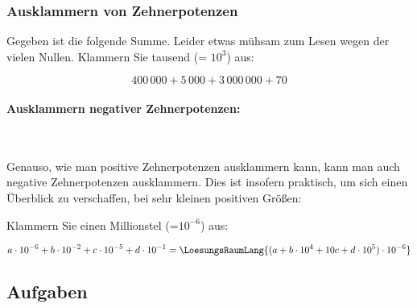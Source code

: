 

\newpage


\subsubsection{Ausklammern von Zehnerpotenzen}
Gegeben ist die folgende Summe. Leider etwas mühsam zum Lesen wegen der vielen Nullen. Klammern Sie tausend (= $10^3$) aus:

$$400\,000 + 5\,000 + 3\,000\,000 + 70$$


\paragraph{Ausklammern negativer Zehnerpotenzen:}
\,

\vspace{1mm}

Genauso, wie man positive Zehnerpotenzen ausklammern kann, kann man auch negative Zehnerpotenzen ausklammern. Dies ist insofern praktisch, um sich einen Überblick zu verschaffen, bei sehr kleinen positiven Größen:

Klammern Sie einen Millionstel (=$10^{-6}$) aus:


$$a\cdot{}10^{-6} + b\cdot{}10^{-2} + c\cdot{}10^{-5} +
d\cdot{}10^{-1} = \LoesungsRaumLang{(a + b\cdot{}10^4 + 10c + d\cdot{}10^{5}) \cdot{} 10^{-6}}$$

\subsection*{Aufgaben}


\newpage
